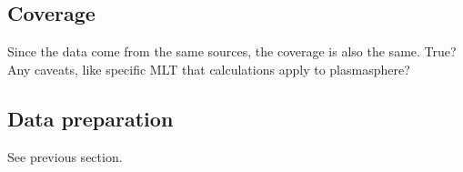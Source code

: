 \subsection{Coverage}
Since the data come from the same sources, the coverage is also the same. 
\vnote True? Any caveats, like specific MLT that calculations apply to plasmasphere?

\subsection{Data preparation}
See previous section. 
